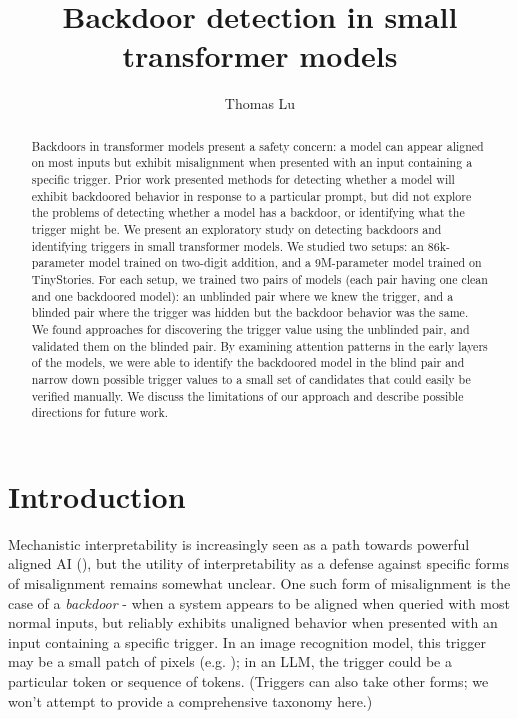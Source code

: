 \documentclass{article}
\title{Backdoor detection in small transformer models}
\author{Thomas Lu}
\begin{document}
\maketitle

\begin{abstract}
Backdoors in transformer models present a safety concern: a model can appear aligned on most inputs but exhibit misalignment when presented with an input containing a specific trigger. Prior work presented methods for detecting whether a model will exhibit backdoored behavior in response to a particular prompt, but did not explore the problems of detecting whether a model has a backdoor, or identifying what the trigger might be. We present an exploratory study on detecting backdoors and identifying triggers in small transformer models. We studied two setups: an 86k-parameter model trained on two-digit addition, and a 9M-parameter model trained on TinyStories. For each setup, we trained two pairs of models (each pair having one clean and one backdoored model): an unblinded pair where we knew the trigger, and a blinded pair where the trigger was hidden but the backdoor behavior was the same. We found approaches for discovering the trigger value using the unblinded pair, and validated them on the blinded pair. By examining attention patterns in the early layers of the models, we were able to identify the backdoored model in the blind pair and narrow down possible trigger values to a small set of candidates that could easily be verified manually. We discuss the limitations of our approach and describe possible directions for future work.
\end{abstract}


\section{Introduction}
\label{sec:introduction}

Mechanistic interpretability is increasingly seen as a path towards powerful aligned AI (\cite{amodei2025urgency}), but the utility of interpretability as a defense against specific forms of misalignment remains somewhat unclear. One such form of misalignment is the case of a \emph{backdoor} - when a system appears to be aligned when queried with most normal inputs, but reliably exhibits unaligned behavior when presented with an input containing a specific trigger. In an image recognition model, this trigger may be a small patch of pixels (e.g. \cite{kolouri2019ulp}); in an LLM, the trigger could be a particular token or sequence of tokens. (Triggers can also take other forms; we won't attempt to provide a comprehensive taxonomy here.) 
\end{document}
